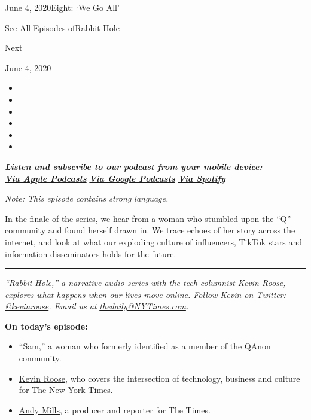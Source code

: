 June 4, 2020Eight: `We Go All'

\href{https://www.nytimes3xbfgragh.onion/column/rabbit-hole}{See All
Episodes ofRabbit Hole}

Next

June 4, 2020

\begin{itemize}
\item
\item
\item
\item
\item
\item
\end{itemize}

\emph{\textbf{Listen and subscribe to our podcast from your mobile
device:}}\\
\textbf{\href{https://podcasts.apple.com/us/podcast/rabbit-hole/id1507423923}{\emph{Via
Apple Podcasts}}} \emph{\textbf{\textbar{}}}
\textbf{\href{https://podcasts.google.com/?feed=aHR0cHM6Ly9yc3MuYXJ0MTkuY29tL3JhYmJpdC1ob2xl\&ved=0CAAQ4aUDahcKEwiwkaDvsuvoAhUAAAAAHQAAAAAQBQ}{\emph{Via
Google Podcasts}}} \emph{\textbf{\textbar{}}}
\textbf{\href{https://open.spotify.com/show/6dqqC8nkBTC3ldRs7pP4qn?si=kQhpaAqDQ4uWM0RR0-QNkg}{\emph{Via
Spotify}}}

\emph{Note: This episode contains strong language.}

In the finale of the series, we hear from a woman who stumbled upon the
``Q'' community and found herself drawn in. We trace echoes of her story
across the internet, and look at what our exploding culture of
influencers, TikTok stars and information disseminators holds for the
future.

\begin{center}\rule{0.5\linewidth}{\linethickness}\end{center}

\emph{``Rabbit Hole,'' a narrative audio series with the tech columnist
Kevin Roose, explores what happens when our lives move online. Follow
Kevin on Twitter:}
\href{https://twitter.com/kevinroose?ref_src=twsrc\%5Egoogle\%7Ctwcamp\%5Eserp\%7Ctwgr\%5Eauthor}{\emph{@kevinroose}}\emph{.
Email us at}
\href{mailto:thedaily@NYTimes.com}{\emph{thedaily@NYTimes.com}}\emph{.}

\textbf{On today's episode:}

\begin{itemize}
\item
  ``Sam,'' a woman who formerly identified as a member of the QAnon
  community.
\item
  \href{https://www.nytimes3xbfgragh.onion/by/kevin-roose}{Kevin Roose},
  who covers the intersection of technology, business and culture for
  The New York Times.
\item
  \href{https://twitter.com/andymillsnyt?lang=en}{Andy Mills}, a
  producer and reporter for The Times.
\end{itemize}

